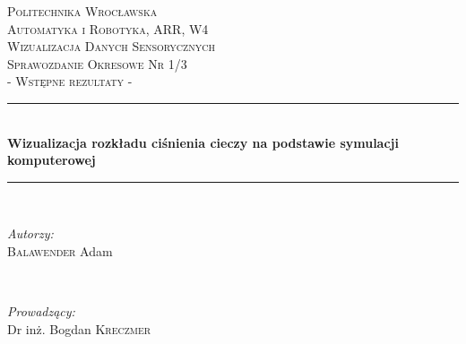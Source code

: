 \begin{titlepage}

\newcommand{\HRule}{\rule{\linewidth}{0.5mm}} %

\center %


\textsc{\LARGE Politechnika Wrocławska\\}
\vspace{0.5cm}
\textsc{\large Automatyka i Robotyka, ARR, W4}\\[4.5cm] %

\textsc{\Large Wizualizacja Danych Sensorycznych}\\[0.5cm] %
\textsc{\large Sprawozdanie Okresowe Nr 1/3 \\ - Wstępne rezultaty -}\\[0.5cm] %


\HRule \\[0.6cm]
{ \huge \bfseries Wizualizacja rozkładu ciśnienia cieczy na podstawie symulacji komputerowej}\\[0.6cm] %
\HRule \\[3.5cm]


\begin{minipage}{0.4\textwidth}
\begin{flushleft} \large
\emph{Autorzy:}\\
\textsc{Balawender} Adam %
\end{flushleft}
\end{minipage}
~
\begin{minipage}{0.4\textwidth}
\begin{flushright} \large
\emph{Prowadzący:} \\
Dr inż. Bogdan \textsc{Kreczmer} %
\end{flushright}
\end{minipage}\\[0.1cm]


\end{titlepage}

